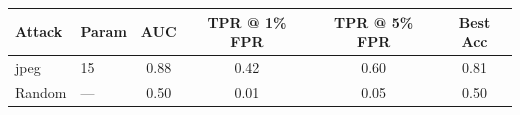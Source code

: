 \begin{tabular}{llcccc}
\toprule
Attack & Param & AUC & TPR @ 1\% FPR & TPR @ 5\% FPR & Best Acc \\
\midrule
jpeg & 15 & 0.88 & 0.42 & 0.60 & 0.81 \\
Random & — & 0.50 & 0.01 & 0.05 & 0.50 \\
\bottomrule
\end{tabular}
